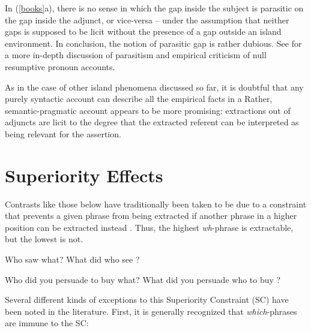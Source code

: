 \documentclass[output=paper]{langsci/langscibook}
\begin{document}
\noindent
In (\ref{books}a), there is no sense in which the gap inside the subject is parasitic on the gap inside the  adjunct, or vice-versa -- under the assumption that neither gaps is supposed to be licit without  the presence of a gap outside an island environment. In conclusion, the notion of parasitic 
gap is rather dubious. See \citet[??]{levhubook} for a more in-depth discussion of parasitism and 
empirical criticism of null resumptive pronoun accounts.

As in the case of other island phenomena discussed so far, it is doubtful  that any purely syntactic account can describe all the empirical facts in a Rather, semantic-pragmatic account  appears to be more promising: extractions out of adjuncts are licit to the degree that the extracted
referent can be interpreted as being relevant for the assertion.




\section{Superiority Effects}

Contrasts like those below have traditionally been taken to be due to a constraint
that prevents a given phrase from being extracted if another phrase in a higher
position can be extracted instead \citep{chomsky73,chomsky80}. Thus, the highest \emph{wh}-phrase
is extractable, but the lowest is not.

\ea
\ea Who \spcs saw what?
\ex \bad{*}What did who see \spc?
\z \label{badsc1}
\z

\ea
\ea Who did you persuade \spcs to buy what?
\ex \bad{*}What did you persuade who to buy \spc?
\z \label{badsc2}
\z

Several different kinds of exceptions to this Superiority Constraint (SC) have been 
noted in the literature. First, it is generally recognized that \emph{which}-phrases are
immune to the SC:
\end{document}
